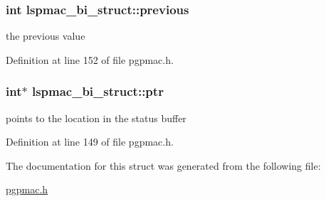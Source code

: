 \hypertarget{structlspmac__bi__struct_a00f09cb3d7bdbe1058fb56bb8c2b0fa3}{
\subsubsection[{previous}]{\setlength{\rightskip}{0pt plus 5cm}int lspmac\-\_\-bi\-\_\-struct\-::previous}}\label{structlspmac__bi__struct_a00f09cb3d7bdbe1058fb56bb8c2b0fa3}


the previous value 



Definition at line 152 of file pgpmac.\-h.

\hypertarget{structlspmac__bi__struct_ae201bf05130bcb6985704ea42efabeb3}{
\subsubsection[{ptr}]{\setlength{\rightskip}{0pt plus 5cm}int$\ast$ lspmac\-\_\-bi\-\_\-struct\-::ptr}}\label{structlspmac__bi__struct_ae201bf05130bcb6985704ea42efabeb3}


points to the location in the status buffer 



Definition at line 149 of file pgpmac.\-h.



The documentation for this struct was generated from the following file\-:\begin{DoxyCompactItemize}
\item 
\hyperlink{pgpmac_8h}{pgpmac.\-h}\end{DoxyCompactItemize}
